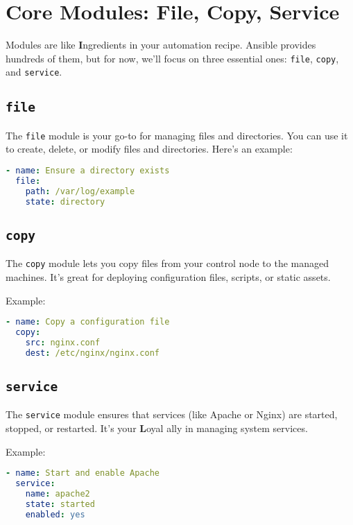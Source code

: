 \section{Core Modules: File, Copy, Service}

Modules are like \textbf{I}ngredients in your automation recipe. Ansible provides hundreds of them, but for now, we'll focus on three essential ones: \texttt{file}, \texttt{copy}, and \texttt{service}.

\subsection{\texttt{file}}

The \texttt{file} module is your go-to for managing files and directories. You can use it to create, delete, or modify files and directories. Here's an example:
\begin{lstlisting}[language=yaml, caption=Using the File Module]
- name: Ensure a directory exists
  file:
    path: /var/log/example
    state: directory
\end{lstlisting}

\subsection{\texttt{copy}}

The \texttt{copy} module lets you copy files from your control node to the managed machines. It's great for deploying configuration files, scripts, or static assets.

Example:
\begin{lstlisting}[language=yaml, caption=Using the Copy Module]
- name: Copy a configuration file
  copy:
    src: nginx.conf
    dest: /etc/nginx/nginx.conf
\end{lstlisting}

\subsection{\texttt{service}}

The \texttt{service} module ensures that services (like Apache or Nginx) are started, stopped, or restarted. It's your \textbf{L}oyal ally in managing system services.

Example:
\begin{lstlisting}[language=yaml, caption=Using the Service Module]
- name: Start and enable Apache
  service:
    name: apache2
    state: started
    enabled: yes
\end{lstlisting}

